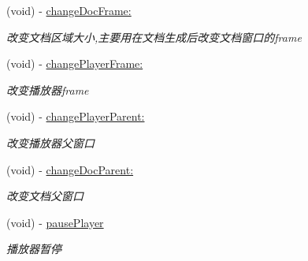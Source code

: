 \begin{DoxyCompactItemize}
\mbox{\label{interface_offline_play_back_a62d3c2f0558f3ce002251dd98e84dbcf}} 
(void) -\/ \hyperlink{interface_offline_play_back_a62d3c2f0558f3ce002251dd98e84dbcf}{change\+Doc\+Frame\+:}
\begin{DoxyCompactList}\small\item\em 改变文档区域大小,主要用在文档生成后改变文档窗口的frame \end{DoxyCompactList}\item 
\mbox{\label{interface_offline_play_back_ac1c40aab1bea6b80a33292a0cfddf002}} 
(void) -\/ \hyperlink{interface_offline_play_back_ac1c40aab1bea6b80a33292a0cfddf002}{change\+Player\+Frame\+:}
\begin{DoxyCompactList}\small\item\em 改变播放器frame \end{DoxyCompactList}\item 
\mbox{\label{interface_offline_play_back_ae83e564798be358b00fb6b0e7172d0f8}} 
(void) -\/ \hyperlink{interface_offline_play_back_ae83e564798be358b00fb6b0e7172d0f8}{change\+Player\+Parent\+:}
\begin{DoxyCompactList}\small\item\em 改变播放器父窗口 \end{DoxyCompactList}\item 
\mbox{\label{interface_offline_play_back_ae90886ca0199a300d123b8dfee178a47}} 
(void) -\/ \hyperlink{interface_offline_play_back_ae90886ca0199a300d123b8dfee178a47}{change\+Doc\+Parent\+:}
\begin{DoxyCompactList}\small\item\em 改变文档父窗口 \end{DoxyCompactList}\item 
\mbox{\label{interface_offline_play_back_afe2a5924e708c918515133b9ded58789}} 
(void) -\/ \hyperlink{interface_offline_play_back_afe2a5924e708c918515133b9ded58789}{pause\+Player}
\begin{DoxyCompactList}\small\item\em 播放器暂停 \end{DoxyCompactList}\item 
\mbox{\label{interface_offline_play_back_a96d5cf73bdffcd575a2e5100547e6e91}} 

\end{DoxyCompactItemize}
